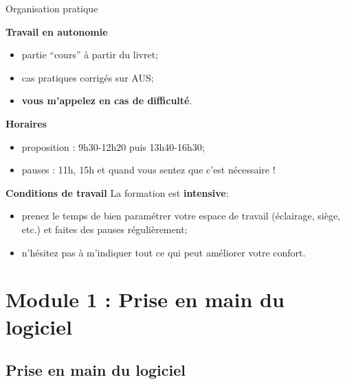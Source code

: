 \documentclass[12pt,ignorenonframetext,]{beamer}
\providecommand{\tightlist}{%
  \setlength{\itemsep}{0pt}\setlength{\parskip}{0pt}}
\newcommand{\strong}[1]{\textbf{\textcolor{redInsee}{#1}}}
\begin{document}
\begin{frame}{Organisation pratique}

\strong{Travail en autonomie}

\begin{itemize}
\tightlist
\item
  \vspace{-0.2cm} partie \enquote{cours} à partir du livret;
\item
  cas pratiques corrigés sur AUS;
\item
  \pause \textbf{vous m'appelez en cas de difficulté}.
\end{itemize}

\bigskip \pause \strong{Horaires}

\begin{itemize}
\tightlist
\item
  \vspace{-0.2cm} proposition : 9h30-12h20 puis 13h40-16h30;
\item
  pauses : 11h, 15h et quand vous sentez que c'est nécessaire !
\end{itemize}

\bigskip \pause \strong{Conditions de travail} La formation est
\textbf{intensive}:

\begin{itemize}
\tightlist
\item
  \vspace{-0.2cm} prenez le temps de bien paramétrer votre espace de
  travail (éclairage, siège, etc.) et faites des pauses régulièrement;
\item
  n'hésitez pas à m'indiquer tout ce qui peut améliorer votre confort.
\end{itemize}

\end{frame}

\section{Module 1 : Prise en main du
logiciel}\label{module-1-prise-en-main-du-logiciel}

\subsection*{Prise en main du logiciel}\label{prise-en-main-du-logiciel}
\end{document}
